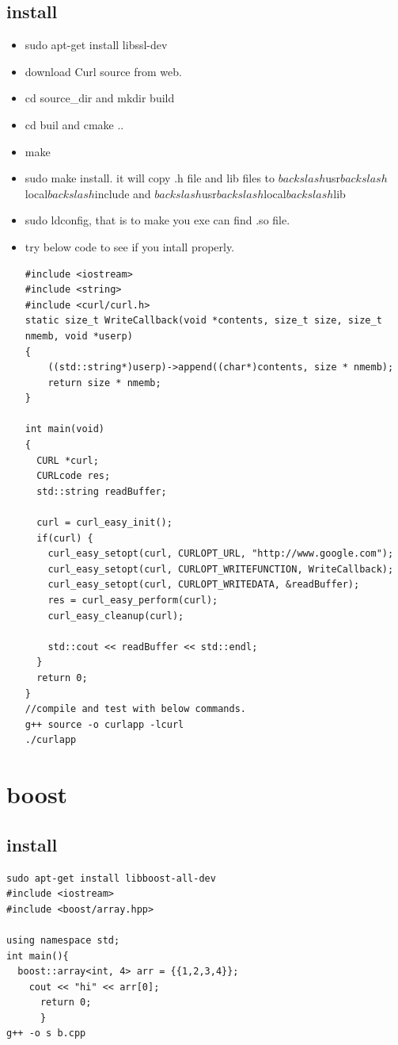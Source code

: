 \documentclass[a4paper,11pt,twoside]{book}
\begin{document}
\subsection{install}
\begin{itemize}
    \item sudo apt-get install libssl-dev
    \item download Curl source from web.
    \item cd source\_dir and mkdir build
    \item cd buil and cmake ..
    \item make 
    \item sudo make install. it will copy .h file and lib files to 
    $backslash$usr$backslash$local$backslash$include and $backslash$usr$backslash$local$backslash$lib
    \item sudo ldconfig, that is to make you exe can find .so file. 
    \item try below code to see if you intall properly.
\begin{lstlisting}[]
#include <iostream>
#include <string>
#include <curl/curl.h>
static size_t WriteCallback(void *contents, size_t size, size_t nmemb, void *userp)
{
    ((std::string*)userp)->append((char*)contents, size * nmemb);
    return size * nmemb;
}

int main(void)
{
  CURL *curl;
  CURLcode res;
  std::string readBuffer;

  curl = curl_easy_init();
  if(curl) {
    curl_easy_setopt(curl, CURLOPT_URL, "http://www.google.com");
    curl_easy_setopt(curl, CURLOPT_WRITEFUNCTION, WriteCallback);
    curl_easy_setopt(curl, CURLOPT_WRITEDATA, &readBuffer);
    res = curl_easy_perform(curl);
    curl_easy_cleanup(curl);

    std::cout << readBuffer << std::endl;
  }
  return 0;
}
//compile and test with below commands.
g++ source -o curlapp -lcurl 
./curlapp
\end{lstlisting}

\end{itemize}
\section{boost}
\subsection{install}
\begin{lstlisting}[]
sudo apt-get install libboost-all-dev
#include <iostream>
#include <boost/array.hpp>

using namespace std;
int main(){
  boost::array<int, 4> arr = {{1,2,3,4}};
    cout << "hi" << arr[0];
      return 0;
      }
g++ -o s b.cpp

\end{lstlisting}
\end{document}
